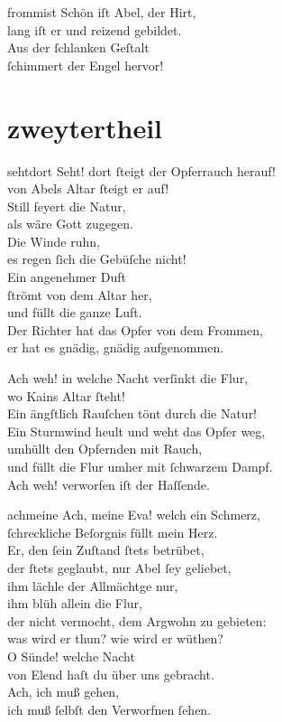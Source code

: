 \documentclass[tocstyle=ref-genre]{ees}
\begin{document}
{\begin{movement}{frommist}
  \voice[Thirza]
  Schön iſt Abel, der Hirt,\\
  lang iſt er und reizend gebildet.\\
  Aus der ſchlanken Geſtalt\\
  ſchimmert der Engel hervor!
\end{movement}

\part{zweytertheil}

\begin{movement}{sehtdort}
  \voice[Chor]
  Seht! dort ſteigt der Opferrauch herauf!\\
  von Abels Altar ſteigt er auf!\\
  Still feyert die Natur,\\
  als wäre Gott zugegen.\\
  Die Winde ruhn,\\
  es regen ſich die Gebüſche nicht!\\
  Ein angenehmer Duft\\
  ſtrömt von dem Altar her,\\
  und füllt die ganze Luft.\\
  Der Richter hat das Opfer von dem Frommen,\\
  er hat es gnädig, gnädig aufgenommen.

  Ach weh! in welche Nacht verſinkt die Flur,\\
  wo Kains Altar ſteht!\\
  Ein ängſtlich Rauſchen tönt durch die Natur!\\
  Ein Sturmwind heult und weht das Opfer weg,\\
  umhüllt den Opfernden mit Rauch,\\
  und füllt die Flur umher mit ſchwarzem Dampf.\\
  Ach weh! verworfen iſt der Haſſende.
\end{movement}

\begin{movement}{achmeine}
  \voice[Adam]
  Ach, meine Eva! welch ein Schmerz,\\
  ſchreckliche Beſorgnis füllt mein Herz.\\
  Er, den ſein Zuſtand ſtets betrübet,\\
  der ſtets geglaubt, nur Abel ſey geliebet,\\
  ihm lächle der Allmächtge nur,\\
  ihm blüh allein die Flur,\\
  der nicht vermocht, dem Argwohn zu gebieten:\\
  was wird er thun? wie wird er wüthen?\\
  O Sünde! welche Nacht\\
  von Elend haſt du über uns gebracht.\\
  Ach, ich muß gehen,\\
  ich muß ſelbſt den Verworfnen ſehen.


\end{movement}}
\end{document}
